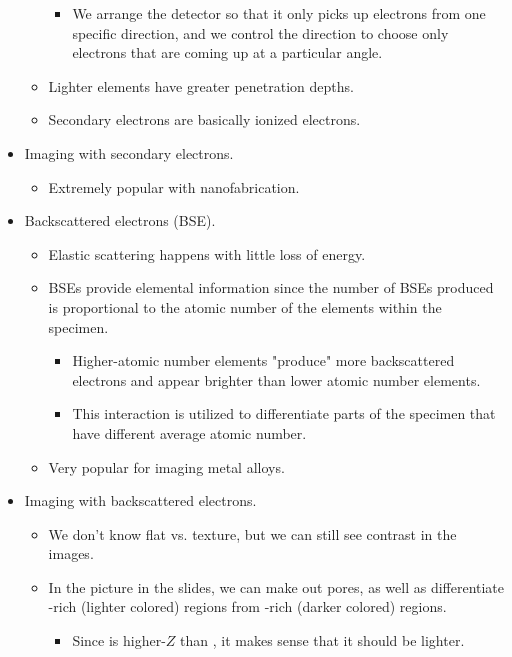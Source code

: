 \documentclass[../notes.tex]{subfiles}
\begin{document}
\begin{itemize}
\begin{itemize}
        \begin{itemize}
            \item We arrange the detector so that it only picks up electrons from one specific direction, and we control the direction to choose only electrons that are coming up at a particular angle.
        \end{itemize}
        \item Lighter elements have greater penetration depths.
        \item Secondary electrons are basically ionized electrons.
    \end{itemize}
    \item Imaging with secondary electrons.
    \begin{itemize}
        \item Extremely popular with nanofabrication.
    \end{itemize}
    \item Backscattered electrons (BSE).
    \begin{itemize}
        \item Elastic scattering happens with little loss of energy.
        \item BSEs provide elemental information since the number of BSEs produced is proportional to the atomic number of the elements within the specimen.
        \begin{itemize}
            \item Higher-atomic number elements "produce" more backscattered electrons and appear brighter than lower atomic number elements.
            \item This interaction is utilized to differentiate parts of the specimen that have different average atomic number.
        \end{itemize}
        \item Very popular for imaging metal alloys.
    \end{itemize}
    \item Imaging with backscattered electrons.
    \begin{itemize}
        \item We don't know flat vs. texture, but we can still see contrast in the images.
        \item In the picture in the slides, we can make out pores, as well as differentiate -rich (lighter colored) regions from -rich (darker colored) regions.
        \begin{itemize}
            \item Since  is higher-$Z$ than , it makes sense that it should be lighter.

\end{itemize}
\end{itemize}
\end{itemize}
\end{document}
